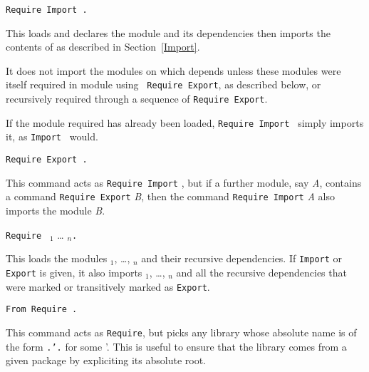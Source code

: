 \begin{Variants}
\item {\tt Require Import {\qualid}.} 

  This loads and declares the module {\qualid} and its dependencies
  then imports the contents of {\qualid} as described in
  Section~\ref{Import}.

  It does not import the modules on which {\qualid} depends unless
  these modules were itself required in module {\qualid} using {\tt
  Require Export}, as described below, or recursively required through
  a sequence of {\tt Require Export}.

  If the module required has already been loaded, {\tt Require Import
  {\qualid}} simply imports it, as {\tt Import {\qualid}} would.

\item {\tt Require Export {\qualid}.}

  This command acts as {\tt Require Import} {\qualid}, but if a
  further module, say {\it A}, contains a command {\tt Require
  Export} {\it B}, then the command {\tt Require Import} {\it A}
  also imports the module {\it B}.

\item {\tt Require } {\qualid}$_1$ {\ldots} {\qualid}$_n${\tt .}

  This loads the modules {\qualid}$_1$, \ldots, {\qualid}$_n$ and
  their recursive dependencies. If {\tt Import} or {\tt Export} is
  given, it also imports {\qualid}$_1$, \ldots, {\qualid}$_n$ and all
  the recursive dependencies that were marked or transitively marked
  as {\tt Export}.

\item {\tt From {\dirpath} Require {\qualid}.}

  This command acts as {\tt Require}, but picks any library whose absolute name
  is of the form {\tt{\dirpath}.{\dirpath'}.{\qualid}} for some {\dirpath'}.
  This is useful to ensure that the {\qualid} library comes from a given
  package by expliciting its absolute root.

\end{Variants}

